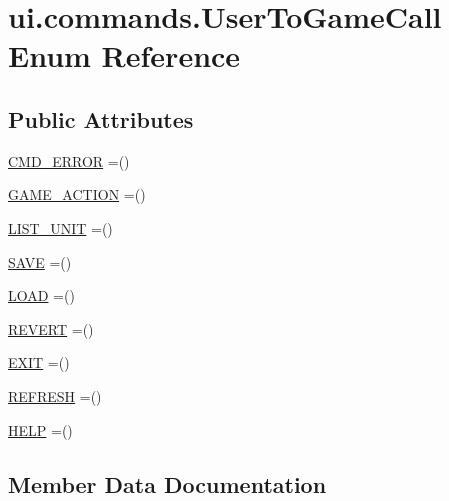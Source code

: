 \hypertarget{enumui_1_1commands_1_1_user_to_game_call}{}\section{ui.\+commands.\+User\+To\+Game\+Call Enum Reference}
\label{enumui_1_1commands_1_1_user_to_game_call}
\subsection*{Public Attributes}
\begin{DoxyCompactItemize}
\item 
\mbox{\hyperlink{enumui_1_1commands_1_1_user_to_game_call_a933740921cbf76aea924f8175b7b6488}{C\+M\+D\+\_\+\+E\+R\+R\+OR}} =()
\item 
\mbox{\hyperlink{enumui_1_1commands_1_1_user_to_game_call_ac61be99d05cde145cbaf1addd4cfc695}{G\+A\+M\+E\+\_\+\+A\+C\+T\+I\+ON}} =()
\item 
\mbox{\hyperlink{enumui_1_1commands_1_1_user_to_game_call_a83e2e06ac45d040db1a475995d0b5ebf}{L\+I\+S\+T\+\_\+\+U\+N\+IT}} =()
\item 
\mbox{\hyperlink{enumui_1_1commands_1_1_user_to_game_call_af61f53990b16b5cfbd61a8aed699c846}{S\+A\+VE}} =()
\item 
\mbox{\hyperlink{enumui_1_1commands_1_1_user_to_game_call_a4b27045be3618cb15c1ed4946718f6e7}{L\+O\+AD}} =()
\item 
\mbox{\hyperlink{enumui_1_1commands_1_1_user_to_game_call_a56311e97d8bad83f4bbccef28e582301}{R\+E\+V\+E\+RT}} =()
\item 
\mbox{\hyperlink{enumui_1_1commands_1_1_user_to_game_call_a7faab55a2fb8684dfa0473563a42939d}{E\+X\+IT}} =()
\item 
\mbox{\hyperlink{enumui_1_1commands_1_1_user_to_game_call_a35d35455ebc84c69dfabc5e09ee211c3}{R\+E\+F\+R\+E\+SH}} =()
\item 
\mbox{\hyperlink{enumui_1_1commands_1_1_user_to_game_call_ac6e57cd265b7f0f6a49c4977ffae25fd}{H\+E\+LP}} =()
\end{DoxyCompactItemize}


\subsection{Member Data Documentation}
\mbox{\label{enumui_1_1commands_1_1_user_to_game_call_a933740921cbf76aea924f8175b7b6488}} 
